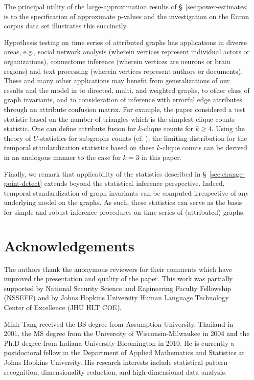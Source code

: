 \documentclass[10pt,draftclsnofoot,onecolumn]{IEEEtran}
\theoremstyle{definition}
\begin{document}
The principal utility of the large-approximation
results of \S~\ref{sec:power-estimates} is to the specification of
approximate p-values and the investigation on the Enron
corpus data set illustrates this succinctly. 


Hypothesis testing on time series of attributed graphs has
applications in diverse areas, e.g., social network analysis (wherein
vertices represent individual actors or organizations), connectome
inference (wherein vertices are neurons or brain regions) and text
processing (wherein vertices represent authors or documents). These
and many other applications may benefit from generalizations of our
results and the model in \cite{lee11} to directed, multi, and weighted
graphs, to other class of graph invariants, and to 
consideration of inference with errorful edge
attributes through an attribute confusion matrix. For example, the
paper considered a test statistic based on the number of triangles
which is the simplest clique counts statistic. One can define
attribute fusion for $k$-clique counts for $k \geq 4$. Using the
theory of $U$-statistics for subgraphs counts
(cf. \cite{nowicki88:_subgr_u_statis_method}), the limiting
distribution for the temporal standardization statistics based on 
these $k$-clique counts can be derived in an analogous manner to the 
case for $k = 3$ in this paper.

Finally, we remark that applicability of the statistics
described in \S~\ref{sec:change-point-detect} extends beyond the
statistical inference perspective. Indeed, temporal standardization of
graph invariants can be computed irrespective of any underlying model
on the graphs. As such, these statistics can
serve as the basis for simple and robust inference procedures on
time-series of (attributed) graphs. 
\section*{Acknowledgements}
The authors thank the anonymous reviewers for their comments which
have improved the presentation and quality of the paper. This work was 
partially supported by National Security Science and Engineering
Faculty Fellowship (NSSEFF) and by Johns Hopkins University Human
Language Technology Center of Excellence (JHU HLT COE).

\begin{IEEEbiography}{Minh Tang}
  received the BS degree from Assumption University,
  Thailand in 2001, the MS degree from the University of
  Wisconsin-Milwaukee in 2004 and the Ph.D degree from Indiana
  University Bloomington in 2010. He is currently a postdoctoral
  fellow in the Department of Applied Mathematics and Statistics at
  Johns Hopkins University. His research interests include statistical
  pattern recognition, dimensionality reduction, and high-dimensional
  data analysis.
  \end{IEEEbiography}
\end{document}
